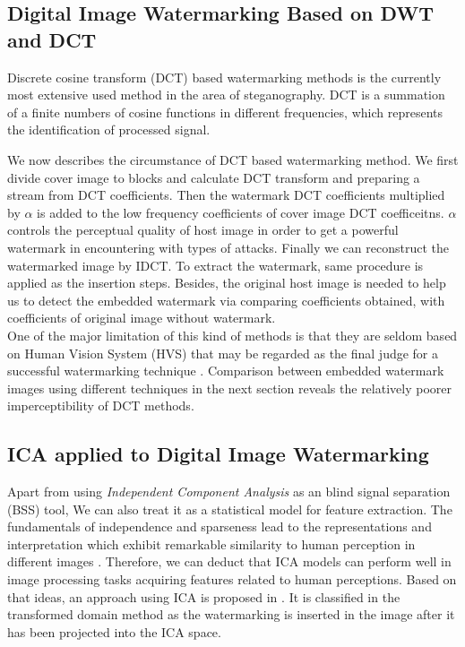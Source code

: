 \subsection{Digital Image Watermarking Based on DWT and DCT}
Discrete cosine transform (DCT) based watermarking methods is the currently most extensive used method in the area of steganography. DCT is a summation of a finite numbers of cosine functions in different frequencies, which represents the identification of processed signal. 

We now describes the circumstance of DCT based watermarking method. We first divide cover image to blocks and calculate DCT transform and preparing a stream from DCT coefficients. Then the watermark DCT coefficients multiplied by $\alpha$ is added to the low frequency coefficients of cover image DCT coefficeitns. $\alpha$ controls the perceptual quality of host image in order to get a powerful watermark in encountering with types of attacks. Finally we can reconstruct the watermarked image by IDCT. To extract the watermark, same procedure is applied as the insertion steps. Besides, the original host image is needed to help us to detect the embedded watermark via comparing coefficients obtained, with coefficients of original image without watermark. \\

One of the major limitation of this kind of methods is that they are seldom based on Human Vision System (HVS) that may be regarded as the final judge for a successful watermarking technique \cite{LuWei_ICA}. Comparison between embedded watermark images using different techniques in the next section reveals the relatively poorer imperceptibility of DCT methods.

\subsection{ICA applied to Digital Image Watermarking}
Apart from using \textit{Independent Component Analysis} as an blind signal separation (BSS) tool, We can also treat it as a statistical model for feature extraction. The fundamentals of independence and sparseness lead to the representations and interpretation which exhibit remarkable similarity to human perception in different images \cite{BELL19973327}. Therefore, we can deduct that ICA
models can perform well in image processing tasks acquiring features related to human perceptions. Based on that ideas, an approach using ICA is proposed in \cite{inproceedingsICA_watermark}. It is classified in the transformed domain method as the watermarking is inserted in the image after it has been projected into the ICA space. \\

